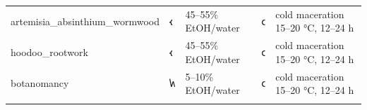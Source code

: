 \documentclass[12pt,a4paper]{article}
\begin{document}
\begin{longtable}[]{@{}lllll@{}}
\begin{minipage}[t]{0.17\columnwidth}\raggedright
artemisia\_absinthium\_wormwood\strut
\end{minipage} & \begin{minipage}[t]{0.17\columnwidth}\raggedright
𐑬\strut
\end{minipage} & \begin{minipage}[t]{0.17\columnwidth}\raggedright
45--55\% EtOH/water\strut
\end{minipage} & \begin{minipage}[t]{0.17\columnwidth}\raggedright
𐑤\strut
\end{minipage} & \begin{minipage}[t]{0.17\columnwidth}\raggedright
cold maceration 15--20 °C, 12--24 h\strut
\end{minipage}\tabularnewline
\begin{minipage}[t]{0.17\columnwidth}\raggedright
hoodoo\_rootwork\strut
\end{minipage} & \begin{minipage}[t]{0.17\columnwidth}\raggedright
𐑬\strut
\end{minipage} & \begin{minipage}[t]{0.17\columnwidth}\raggedright
45--55\% EtOH/water\strut
\end{minipage} & \begin{minipage}[t]{0.17\columnwidth}\raggedright
𐑤\strut
\end{minipage} & \begin{minipage}[t]{0.17\columnwidth}\raggedright
cold maceration 15--20 °C, 12--24 h\strut
\end{minipage}\tabularnewline
\begin{minipage}[t]{0.17\columnwidth}\raggedright
botanomancy\strut
\end{minipage} & \begin{minipage}[t]{0.17\columnwidth}\raggedright
𐑿\strut
\end{minipage} & \begin{minipage}[t]{0.17\columnwidth}\raggedright
5--10\% EtOH/water\strut
\end{minipage} & \begin{minipage}[t]{0.17\columnwidth}\raggedright
𐑤\strut
\end{minipage} & \begin{minipage}[t]{0.17\columnwidth}\raggedright
cold maceration 15--20 °C, 12--24 h\strut
\end{minipage}\tabularnewline
\begin{minipage}[t]{0.17\columnwidth}\raggedright

\end{minipage}
\end{longtable}
\end{document}
